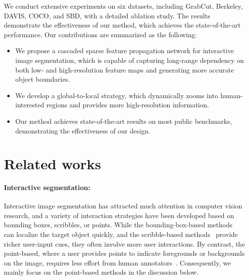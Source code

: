 \documentclass{bmvc2k}
\begin{document}
We conduct extensive experiments on six datasets, including GrabCut, Berkeley, DAVIS, COCO, and SBD, with a detailed ablation study. The results demonstrate the effectiveness of our method, which achieves the state-of-the-art performance.
Our contributions are summarized as the following:
\begin{itemize}
\item We propose a cascaded sparse feature propagation network for interactive image segmentation, which is capable of capturing long-range dependency on both low- and high-resolution feature maps and generating more accurate object boundaries. 
\item We develop a global-to-local strategy, which dynamically zooms into human-interested regions and provides more high-resolution information.
\item Our method achieves state-of-the-art results on most public benchmarks, demonstrating the effectiveness of our design. 
\end{itemize} \section{Related works}
\paragraph*{Interactive segmentation:}
Interactive image segmentation has attracted much attention in computer vision research, and a variety of interaction strategies have been developed based on bounding boxes, scribbles, or points. While the bounding-box-based methods~\cite{rother2004grabcut,zhang2020interactive,wu2014milcut} can localize the target object quickly, and the scribble-based methods~\cite{grady2006random,bai2014error,gulshan2010geodesic,agustsson2019interactive} provide richer user-input cues, they often involve more user interactions. By contrast, the point-based, where a user provides points to indicate foregrounds or backgrounds on the image, requires less effort from human annotators~\cite{xu2016deep,sofiiuk2020f,sofiiuk2021reviving,chen2021conditional,benenson2019large,Hao_2021_ICCV}. Consequently, we mainly focus on the point-based methods in the discussion below.
\end{document}
